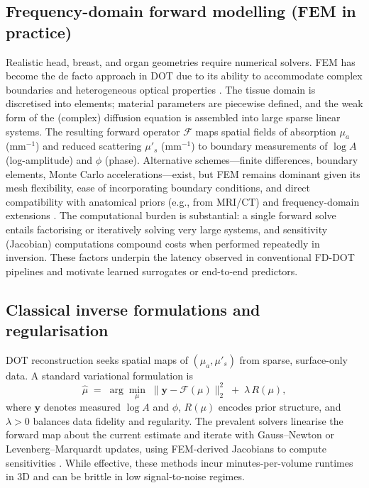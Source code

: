 \subsection{Frequency-domain forward modelling (FEM in practice)}
Realistic head, breast, and organ geometries require numerical solvers. FEM has become the de facto approach in DOT due to its ability to accommodate complex boundaries and heterogeneous optical properties \cite{dehghani2009}. The tissue domain is discretised into elements; material parameters are piecewise defined, and the weak form of the (complex) diffusion equation is assembled into large sparse linear systems. The resulting forward operator $\mathcal{F}$ maps spatial fields of absorption $\mu_a$ (mm$^{-1}$) and reduced scattering $\mu'_s$ (mm$^{-1}$) to boundary measurements of $\log A$ (log-amplitude) and $\phi$ (phase). Alternative schemes—finite differences, boundary elements, Monte Carlo accelerations—exist, but FEM remains dominant given its mesh flexibility, ease of incorporating boundary conditions, and direct compatibility with anatomical priors (e.g., from MRI/CT) and frequency-domain extensions \cite{dehghani2009}. The computational burden is substantial: a single forward solve entails factorising or iteratively solving very large systems, and sensitivity (Jacobian) computations compound costs when performed repeatedly in inversion. These factors underpin the latency observed in conventional FD-DOT pipelines and motivate learned surrogates or end-to-end predictors.

\subsection{Classical inverse formulations and regularisation}
DOT reconstruction seeks spatial maps of $(\mu_a,\mu'_s)$ from sparse, surface-only data. A standard variational formulation is
\[
\hat{\mu} \;=\; \arg\min_{\mu}\;\big\| \mathbf{y} - \mathcal{F}(\mu) \big\|_2^2 \;+\; \lambda\,R(\mu),
\]
where $\mathbf{y}$ denotes measured $\log A$ and $\phi$, $R(\mu)$ encodes prior structure, and $\lambda>0$ balances data fidelity and regularity. The prevalent solvers linearise the forward map about the current estimate and iterate with Gauss–Newton or Levenberg–Marquardt updates, using FEM-derived Jacobians to compute sensitivities \cite{arridge1999}. While effective, these methods incur minutes-per-volume runtimes in 3D and can be brittle in low signal-to-noise regimes.

